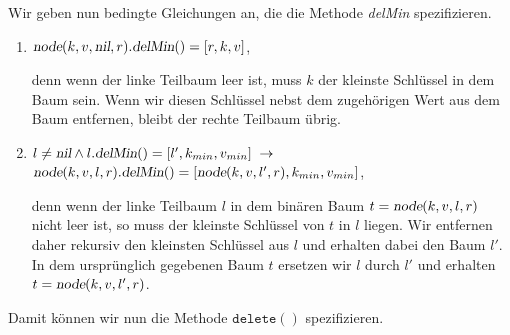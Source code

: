Wir geben nun bedingte Gleichungen an, die die Methode \textsl{delMin} spezifizieren.
\begin{enumerate}
\item $\textsl{node}(k, v, \textsl{nil}, r)\mathtt{.}\textsl{delMin}() = [r, k, v]$,

      denn wenn der linke Teilbaum leer ist, muss $k$ der kleinste Schl\"ussel in 
      dem Baum sein.  Wenn wir diesen  Schl\"ussel nebst dem zugeh\"origen Wert aus dem Baum
      entfernen, bleibt der rechte Teilbaum \"ubrig.

\item $l\not= \textsl{nil} \wedge l\mathtt{.}\textsl{delMin}() = [l',k_{min}, v_{min}] \;\rightarrow$ \\[0.1cm]
       \hspace*{1.3cm} 
       $\textsl{node}(k, v, l, r)\mathtt{.}\textsl{delMin}() = [\textsl{node}(k, v, l', r), k_{min}, v_{min}]$,

      denn wenn der linke Teilbaum $l$ in dem bin\"aren Baum $t = \textsl{node}(k, v, l, r)$
      nicht leer ist, so muss der kleinste Schl\"ussel von $t$ in $l$ liegen.
      Wir entfernen daher rekursiv den kleinsten Schl\"ussel aus $l$ und erhalten dabei den
      Baum $l'$.  In dem urspr\"unglich gegebenen Baum $t$ ersetzen wir $l$ durch $l'$ und erhalten
      $t = \textsl{node}(k, v, l', r)$.
\end{enumerate}
Damit k\"onnen wir nun die Methode $\mathtt{delete}()$ spezifizieren.
